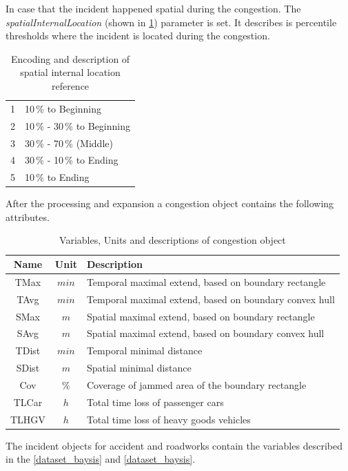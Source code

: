 In case that the incident happened spatial during the congestion. The \textit{spatialInternalLocation} (shown in \cref{tbl:jam_classification_ILS}) parameter is set. It describes is percentile thresholds where the incident is located during the congestion.
\begin{table}[ht!]
	\centering
	\begin{tabular}{c|l}  
		1 & 10\,\% to Beginning \\
 		2 & 10\,\% - 30\,\% to Beginning \\
 		3 & 30\,\% - 70\,\% (Middle) \\
 		4 & 30\,\% - 10\,\% to Ending \\
 		5 & 10\,\% to Ending \\
	\end{tabular}
	\caption{Encoding and description of spatial internal location reference}
	\label{tbl:jam_classification_ILS}
	\vspace{-4mm}
\end{table}
    
After the processing and expansion a congestion object contains the following attributes.
\begin{table}[ht!]
	\centering
	\begin{tabular}{c|c|l} 
		\toprule
		Name & Unit & Description \\
		\midrule 
		TMax  & $min$ & Temporal maximal extend, based on boundary rectangle \\
		TAvg  & $min$ & Temporal maximal extend, based on boundary convex hull \\
		SMax  & $m$   & Spatial maximal extend, based on boundary rectangle \\
		SAvg  & $m$   & Spatial maximal extend, based on boundary convex hull \\
		TDist & $min$ & Temporal minimal distance \\
		SDist & $m$   & Spatial minimal distance \\
		Cov   & $\%$  & Coverage of jammed area of the boundary rectangle \\
		TLCar & $h$   & Total time loss of passenger cars \\
		TLHGV & $h$   & Total time loss of heavy goods vehicles \\
		\bottomrule
	\end{tabular}
	\caption{Variables, Units and descriptions of congestion object}
\end{table}

The incident objects for accident and roadworks contain the variables described in the \cref{dataset_baysis} and \cref{dataset_baysis}.

